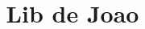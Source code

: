 \documentclass[10pt]{article}
\title{\vspace{-4ex}\Large{Lib de Joao}}
\author{}
\date{}
\begin{document}
\begin{landscape}
\begin{multicols}{2}

\maketitle
\vspace{-13ex}
\tableofcontents
\pagestyle{fancy}



\end{multicols}
\end{landscape}
\end{document}
